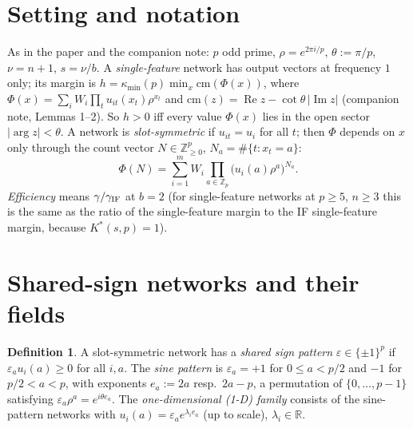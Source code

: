 \documentclass[11pt]{article}
\theoremstyle{definition}
\newtheorem{definition}[theorem]{Definition}
\renewcommand{\Re}{\operatorname{Re}}
\renewcommand{\Im}{\operatorname{Im}}
\begin{document}
\begin{abstract}
order-three dissociation) and reduces every $n$ to a single-feature atom constant.  The single-feature payments at $n=2$ are proved sharp and $p$-free (P$_{12}$, and $c_1(2,s)=1-3^{1-s}$, the latter computer-assisted).  With them the relations case at $n=2$ is closed for every $p\le59$.  Near the interference-free networks the discount from interference is quadratic and the slack it forces is linear.  So at $n=2$, in the relations case and in class $\mathcal C$, at every prime and for any number of cheap features, no network close to an interference-free one beats the prediction (Theorem~\ref{thm:nearif}).  In the relations case what remains is wholesale rebuilds with macroscopic, cancelling interference.  Section~\ref{sec:arch} shows how the open steps fit together.
The remaining steps are stated as open problems
(O1)--(O4): a coverage-to-Sidon inequality, compensation costs, single-feature constants for $n\ge3$, and $p=5$ at large $n$.
Every numerical test at $p\ge5$ found no network beating the interference-free value.
So the correct universal statement is the price--programme form, and the open content is concentrated in precise questions for $p\ge5$.
\end{abstract}

\section{Setting and notation}
As in the paper and the companion note: $p$ odd prime, $\rho=e^{2\pi i/p}$, $\theta:=\pi/p$, $\nu=n+1$, $s=\nu/b$.  A
\emph{single-feature} network has output vectors at frequency $1$ only; its margin is $h=\kappa_{\min}(p)\min_x\mathrm{cm}(\Phi(x))$,
where $\Phi(x)=\sum_iW_i\prod_tu_{it}(x_t)\rho^{x_t}$ and $\mathrm{cm}(z)=\Re z-\cot\theta\,|\Im z|$ (companion note,
Lemmas 1--2).  So $h>0$ iff every value $\Phi(x)$ lies in the open sector $|\arg z|<\theta$.  A network is
\emph{slot-symmetric} if $u_{it}=u_i$ for all $t$; then $\Phi$ depends on $x$ only through the count vector
$N\in\mathbb Z_{\ge0}^p$, $N_a=\#\{t:x_t=a\}$:
\[\Phi(N)=\sum_{i=1}^mW_i\prod_{a\in\mathbb Z_p}\big(u_i(a)\rho^a\big)^{N_a}.\]
\emph{Efficiency} means $\gamma/\gamma_{\rm IF}$ at $b=2$ (for single-feature networks at $p\ge5$, $n\ge3$ this is the same as
the ratio of the single-feature margin to the IF single-feature margin, because $K^*(s,p)=1$).

\section{Shared-sign networks and their fields}
\begin{definition}
A slot-symmetric network has a \emph{shared sign pattern} $\varepsilon\in\{\pm1\}^{p}$ if $\varepsilon_au_i(a)\ge0$ for all
$i,a$.  The \emph{sine pattern} is $\varepsilon_a=+1$ for $0\le a<p/2$ and $-1$ for $p/2<a<p$, with exponents
$e_a:=2a$ resp.\ $2a-p$, a permutation of $\{0,\dots,p-1\}$ satisfying $\varepsilon_a\rho^a=e^{i\theta e_a}$.  The
\emph{one-dimensional (1-D) family} consists of the sine-pattern networks with $u_i(a)=\varepsilon_a e^{\lambda_ie_a}$
(up to scale), $\lambda_i\in\mathbb R$.
\end{definition}
\end{document}
